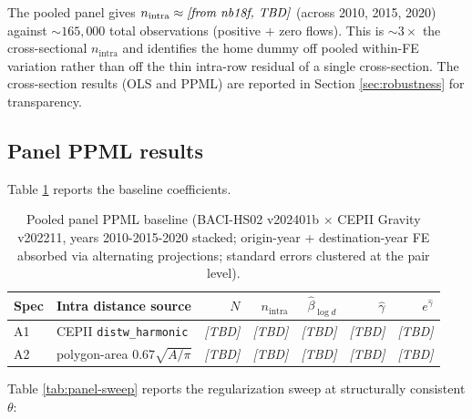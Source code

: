 The pooled panel gives $n_{\text{intra}} \approx \emph{[from nb18f, TBD]}$
(across 2010, 2015, 2020) against $\sim 165{,}000$ total observations
(positive + zero flows). This is $\sim 3\times$ the cross-sectional
$n_{\text{intra}}$ and identifies the home dummy off pooled
within-FE variation rather than off the thin intra-row residual of
a single cross-section. The cross-section results (OLS and PPML)
are reported in Section \ref{sec:robustness} for transparency.

\subsection{Panel PPML results}

Table \ref{tab:panel-baseline} reports the baseline coefficients.

\begin{table}[h]
\centering
\small
\caption{Pooled panel PPML baseline (BACI-HS02 v202401b $\times$ CEPII
Gravity v202211, years 2010-2015-2020 stacked; origin-year + destination-year
FE absorbed via alternating projections; standard errors clustered at the
pair level).\label{tab:panel-baseline}}
\begin{tabular}{l l r r r r r}
\toprule
Spec & Intra distance source & $N$ & $n_{\text{intra}}$ & $\hat{\beta}_{\log d}$ & $\hat{\gamma}$ & $e^{\hat{\gamma}}$ \\
\midrule
A1 & CEPII \texttt{distw\_harmonic} & \emph{[TBD]} & \emph{[TBD]} & \emph{[TBD]} & \emph{[TBD]} & \emph{[TBD]} \\
A2 & polygon-area $0.67\sqrt{A/\pi}$ & \emph{[TBD]} & \emph{[TBD]} & \emph{[TBD]} & \emph{[TBD]} & \emph{[TBD]} \\
\bottomrule
\end{tabular}
\end{table}

Table \ref{tab:panel-sweep} reports the regularization sweep at
structurally consistent $\theta$:


